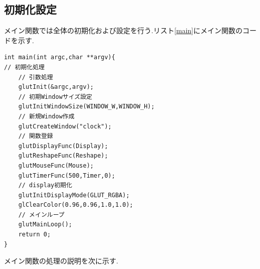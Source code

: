 \documentclass[a4j]{jarticle}
\begin{document}
  \subsection{初期化設定}
  メイン関数では全体の初期化および設定を行う.リスト\ref{main}にメイン関数のコードを示す.
  \begin{lstlisting}[basicstyle=\ttfamily\footnotesize, frame=single,label=main,caption=main関数]
int main(int argc,char **argv){
// 初期化処理
    // 引数処理
    glutInit(&argc,argv);
    // 初期Windowサイズ設定
    glutInitWindowSize(WINDOW_W,WINDOW_H);
    // 新規Window作成
    glutCreateWindow("clock");
    // 関数登録
    glutDisplayFunc(Display);
    glutReshapeFunc(Reshape);
    glutMouseFunc(Mouse);
    glutTimerFunc(500,Timer,0);
    // display初期化
    glutInitDisplayMode(GLUT_RGBA);
    glClearColor(0.96,0.96,1.0,1.0);
    // メインループ
    glutMainLoop();
    return 0;
}
  \end{lstlisting}   
  メイン関数の処理の説明を次に示す.
\end{document}
